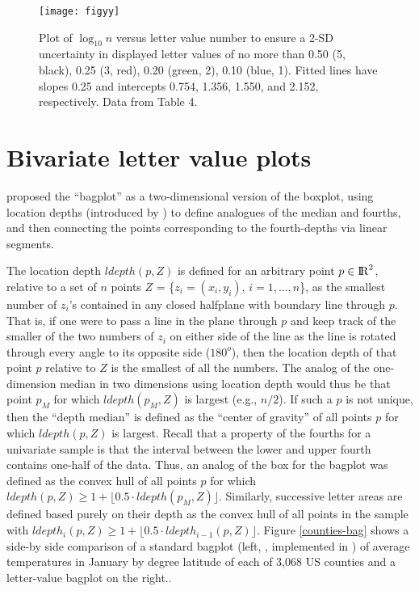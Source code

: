 \documentclass[oneside]{article}
\newcommand{\Reals}{{\rm I\kern-.1667em{}R}}
\begin{document}
\begin{figure}[hbtp]
  \centering
  \texttt{[image: figyy]}

  \caption{Plot of $\log_{10} n$ versus letter value number to ensure a 2-SD
  uncertainty in displayed letter values of no more than 0.50 (5, black), 0.25
  (3, red), 0.20 (green, 2), 0.10 (blue, 1). Fitted lines have slopes 0.25 and
  intercepts 0.754, 1.356, 1.550, and 2.152, respectively. Data from Table 4.}
  \label{figyy} 
\end{figure}

\section{Bivariate letter value plots}
\label{sec:bivariate}

\citet{bagplots} proposed the ``bagplot'' as a two-dimensional version of the boxplot, using location depths (introduced by \citet{tukey75}) to define analogues of the median and fourths, and then connecting the points corresponding to the fourth-depths via linear segments. 

The location depth $ldepth(p,Z)$ is defined for an arbitrary point $p \in \Reals^2$, relative to a set of $n$ points $Z$ = \{$z_i = (x_i, y_i)$, $i = 1,...,n$\}, as the smallest number of $z_i$'s contained in any closed halfplane with boundary line through $p$. That is, if one were to pass a line in the plane through $p$ and keep track of the smaller of the two numbers of $z_i$ on either side of the line as the line is rotated through every angle to its opposite side ($180^o$), then the location depth of that point $p$ relative to $Z$ is the smallest of all the numbers. The analog of the one-dimension median in two dimensions using location depth would thus be that point $p_M$ for which $ldepth(p_M, Z)$ is largest (e.g., $n/2$). If such a $p$ is not unique, then the ``depth median'' is defined as the ``center of gravity'' of all points $p$ for which $ldepth(p,Z)$ is largest. Recall that a property of the fourths for a univariate sample is that the interval between the lower and upper fourth contains one-half of the data. Thus, an analog of the box for the bagplot was defined as the convex hull of all points $p$ for which $ldepth(p,Z) \ge 1 +  \lfloor 0.5 \cdot  ldepth(p_M, Z) \rfloor$. Similarly,  successive letter areas are defined based purely on their depth as the convex hull of all points in the sample with $ldepth_i(p,Z) \ge 1 +  \lfloor 0.5 \cdot  ldepth_{i-1}(p, Z) \rfloor$.
Figure \ref{counties-bag} shows a side-by side comparison of a standard bagplot (left, \citet{bagplots}, implemented in \citet{aplpack}) of average temperatures in January by degree latitude of each of 3,068 US counties and a letter-value bagplot on the right..
\end{document}
